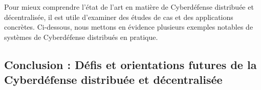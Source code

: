 
Pour mieux comprendre l'état de l'art en matière de Cyberdéfense distribuée et décentralisée, il est utile d'examiner des études de cas et des applications concrètes. Ci-dessous, nous mettons en évidence plusieurs exemples notables de systèmes de Cyberdéfense distribués en pratique.







\subsection{Conclusion : Défis et orientations futures de la Cyberdéfense distribuée et décentralisée}

